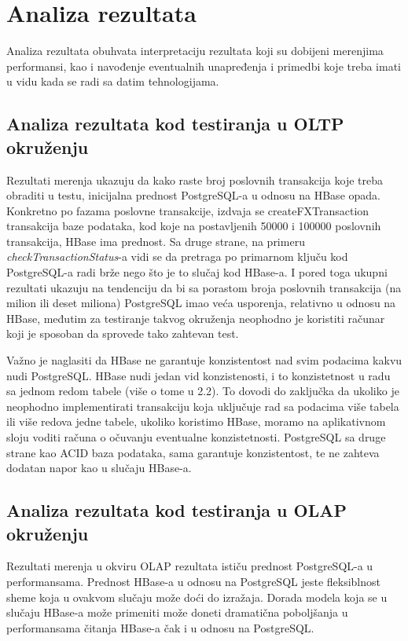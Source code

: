 \documentclass[12pt,oneside]{memoir}
\begin{document}
\chapter{Analiza rezultata}

Analiza rezultata obuhvata interpretaciju rezultata koji su dobijeni merenjima performansi, kao i navođenje eventualnih unapređenja i primedbi koje treba imati u vidu kada se radi sa datim tehnologijama.

\section{Analiza rezultata kod testiranja u OLTP okruženju}

Rezultati merenja ukazuju da kako raste broj poslovnih transakcija koje treba obraditi u testu, inicijalna prednost PostgreSQL-a u odnosu na HBase opada. Konkretno po fazama poslovne transakcije, izdvaja se createFXTransaction transakcija baze podataka, kod koje na postavljenih 50000 i 100000  poslovnih transakcija, HBase ima prednost. Sa druge strane, na primeru \textit{checkTransactionStatus}-a vidi se da pretraga po primarnom ključu kod PostgreSQL-a radi brže nego što je to slučaj kod HBase-a.  I pored toga ukupni rezultati ukazuju na tendenciju da bi sa porastom broja poslovnih transakcija (na milion ili deset miliona) PostgreSQL imao veća usporenja, relativno u odnosu na HBase, međutim za testiranje takvog okruženja neophodno je koristiti računar koji je sposoban da sprovede tako zahtevan test.

Važno je naglasiti da HBase ne garantuje konzistentost nad svim podacima kakvu nudi PostgreSQL. HBase nudi jedan vid konzistenosti, i to konzistetnost u radu sa jednom redom tabele (više o tome u 2.2). To dovodi do zaključka da ukoliko je neophodno implementirati transakciju koja uključuje rad sa podacima više tabela ili više redova jedne tabele, ukoliko koristimo HBase, moramo na aplikativnom sloju voditi računa o očuvanju  eventualne konzistetnosti. PostgreSQL sa druge strane kao ACID baza podataka, sama garantuje konzistentost, te ne zahteva dodatan napor kao u slučaju HBase-a. 

\section{Analiza rezultata kod testiranja u OLAP okruženju}

Rezultati merenja u okviru OLAP rezultata ističu prednost PostgreSQL-a u performansama. Prednost HBase-a u odnosu na PostgreSQL jeste fleksiblnost sheme koja u ovakvom slučaju može doći do izražaja. Dorada modela koja se u slučaju HBase-a može primeniti može doneti dramatična poboljšanja u performansama čitanja HBase-a čak i u odnosu na PostgreSQL. 
\end{document}
